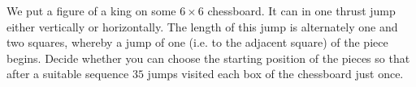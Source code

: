 We put a figure of a king on some $6 \times  6$ chessboard. It can in one thrust jump either vertically or horizontally. The length of this jump is alternately one and two squares, whereby a jump of one (i.e. to the adjacent square) of the piece begins. Decide whether you can choose the starting position of the pieces so that after a suitable sequence
$35$ jumps visited each box of the chessboard just once.